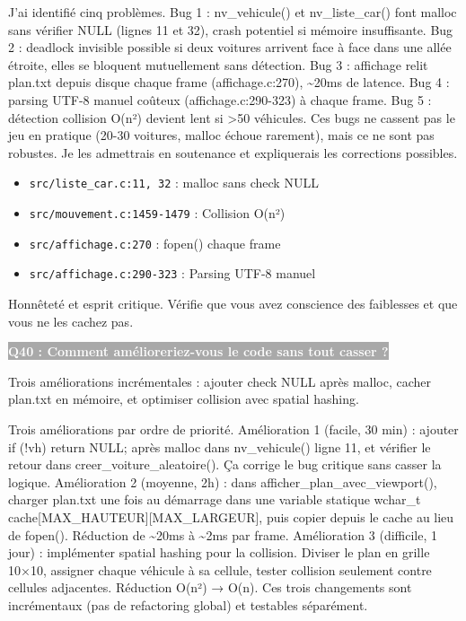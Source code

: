 \documentclass[12pt,a4paper]{article}
\newcommand{\question}[1]{%
    \vspace{0.5cm}
    \noindent\colorbox{darkgray}{\textcolor{white}{\textbf{#1}}}
    \vspace{0.3cm}
}
\begin{document}
\begin{reponse_longue}
J'ai identifié cinq problèmes. Bug 1 : nv\_vehicule() et nv\_liste\_car() font malloc sans vérifier NULL (lignes 11 et 32), crash potentiel si mémoire insuffisante. Bug 2 : deadlock invisible possible si deux voitures arrivent face à face dans une allée étroite, elles se bloquent mutuellement sans détection. Bug 3 : affichage relit plan.txt depuis disque chaque frame (affichage.c:270), \textasciitilde{}20ms de latence. Bug 4 : parsing UTF-8 manuel coûteux (affichage.c:290-323) à chaque frame. Bug 5 : détection collision O(n²) devient lent si >50 véhicules. Ces bugs ne cassent pas le jeu en pratique (20-30 voitures, malloc échoue rarement), mais ce ne sont pas robustes. Je les admettrais en soutenance et expliquerais les corrections possibles.
\end{reponse_longue}

\begin{reference_code}
\begin{itemize}
    \item \texttt{src/liste\_car.c:11, 32} : malloc sans check NULL
    \item \texttt{src/mouvement.c:1459-1479} : Collision O(n²)
    \item \texttt{src/affichage.c:270} : fopen() chaque frame
    \item \texttt{src/affichage.c:290-323} : Parsing UTF-8 manuel
\end{itemize}
\end{reference_code}

\begin{objectif_prof}
Honnêteté et esprit critique. Vérifie que vous avez conscience des faiblesses et que vous ne les cachez pas.
\end{objectif_prof}

\question{Q40 : Comment amélioreriez-vous le code sans tout casser ?}

\begin{reponse_courte}
Trois améliorations incrémentales : ajouter check NULL après malloc, cacher plan.txt en mémoire, et optimiser collision avec spatial hashing.
\end{reponse_courte}

\begin{reponse_longue}
Trois améliorations par ordre de priorité. Amélioration 1 (facile, 30 min) : ajouter if (!vh) return NULL; après malloc dans nv\_vehicule() ligne 11, et vérifier le retour dans creer\_voiture\_aleatoire(). Ça corrige le bug critique sans casser la logique. Amélioration 2 (moyenne, 2h) : dans afficher\_plan\_avec\_viewport(), charger plan.txt une fois au démarrage dans une variable statique wchar\_t cache[MAX\_HAUTEUR][MAX\_LARGEUR], puis copier depuis le cache au lieu de fopen(). Réduction de \textasciitilde{}20ms à \textasciitilde{}2ms par frame. Amélioration 3 (difficile, 1 jour) : implémenter spatial hashing pour la collision. Diviser le plan en grille 10×10, assigner chaque véhicule à sa cellule, tester collision seulement contre cellules adjacentes. Réduction O(n²) → O(n). Ces trois changements sont incrémentaux (pas de refactoring global) et testables séparément.
\end{reponse_longue}
\end{document}
